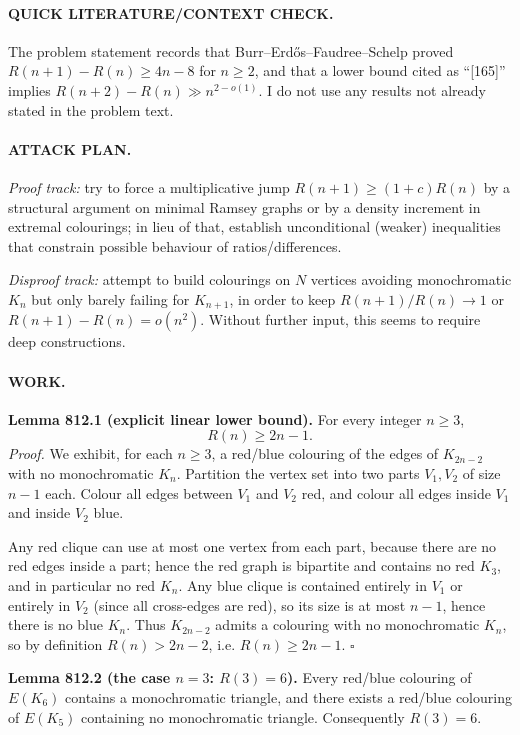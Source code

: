 \paragraph{QUICK LITERATURE/CONTEXT CHECK.}
The problem statement records that Burr--Erd\H{o}s--Faudree--Schelp proved $R(n+1)-R(n)\ge 4n-8$ for $n\ge2$, and that a lower bound cited as ``[165]'' implies $R(n+2)-R(n)\gg n^{2-o(1)}$. I do not use any results not already stated in the problem text.

\paragraph{ATTACK PLAN.}
\emph{Proof track:} try to force a multiplicative jump $R(n+1)\ge (1+c)R(n)$ by a structural argument on minimal Ramsey graphs or by a density increment in extremal colourings; in lieu of that, establish unconditional (weaker) inequalities that constrain possible behaviour of ratios/differences.

\emph{Disproof track:} attempt to build colourings on $N$ vertices avoiding monochromatic $K_n$ but only barely failing for $K_{n+1}$, in order to keep $R(n+1)/R(n)\to 1$ or $R(n+1)-R(n)=o(n^2)$. Without further input, this seems to require deep constructions.

\paragraph{WORK.}
\textbf{Lemma 812.1 (explicit linear lower bound).}
For every integer $n\ge 3$,
\[
R(n) \ge 2n-1.
\]
\emph{Proof.}
We exhibit, for each $n\ge3$, a red/blue colouring of the edges of $K_{2n-2}$ with no monochromatic $K_n$.
Partition the vertex set into two parts $V_1,V_2$ of size $n-1$ each.
Colour all edges between $V_1$ and $V_2$ red, and colour all edges inside $V_1$ and inside $V_2$ blue.

Any red clique can use at most one vertex from each part, because there are no red edges inside a part; hence the red graph is bipartite and contains no red $K_3$, and in particular no red $K_n$.
Any blue clique is contained entirely in $V_1$ or entirely in $V_2$ (since all cross-edges are red), so its size is at most $n-1$, hence there is no blue $K_n$.
Thus $K_{2n-2}$ admits a colouring with no monochromatic $K_n$, so by definition $R(n)>2n-2$, i.e. $R(n)\ge 2n-1$.
\hfill $\square$

\textbf{Lemma 812.2 (the case $n=3$: $R(3)=6$).}
Every red/blue colouring of $E(K_6)$ contains a monochromatic triangle, and there exists a red/blue colouring of $E(K_5)$ containing no monochromatic triangle. Consequently $R(3)=6$.

